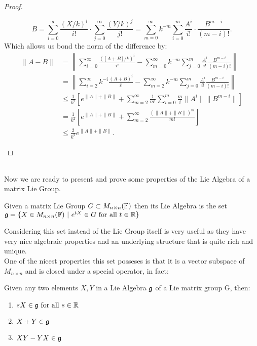 \begin{proof}
\begin{enumerate}[label=(\alph*)]
		$$B=\sum_{i=0}^\infty \frac{(X/k)^i}{i!}\cdot  \sum_{j=0}^\infty   \frac{(Y/k)^j}{j!}= \sum_{m=0}^\infty k^{-m} \sum_{i=0}^m \frac{A^i}{i!}\cdot \frac{B^{m-i}}{(m-i)!}.$$
		Which allows us bond the norm of the difference by:
		\begin{align*}
		\|A-B\| &= \left\|\sum_{i=0}^\infty \frac{([A+B]/k)^i}{i!} - \sum_{m=0}^\infty k^{-m} \sum_{j=0}^m \frac{A^i}{i!}\frac{B^{m-i}}{(m-i)!}\right\|\\
		&=\left\|\sum_{i=2}^\infty k^{-i}\frac{(A+B)^i}{i!} - \sum_{m=2}^\infty k^{-m}\sum_{j=0}^m \frac{A^i}{i!}\frac{B^{m-i}}{(m-i)!}\right\|\\
		&\le \frac{1}{k^2}\left[e^{\|A\|+\|B\|}+\sum_{m=2}^\infty \frac{1}{m!}\sum_{i=0}^m \frac{m}{i}\|A^i\| \|B^{m-i}\|\right]\\
		&= \frac{1}{k^2}\left[e^{\|A\|+\|B\|} + \sum_{m=2}^\infty \frac{(\|A\|+\|B\|)^m}{m!}\right]\\
		&\le \frac{2}{k^2}e^{\|A\|+\|B\|}.
		\end{align*}
	\end{enumerate}
\end{proof}\\
Now we are ready to present and prove some properties of the Lie Algebra of a matrix Lie Group.
\begin{defi}
	Given a matrix Lie Group $G\subset M_{n\times n}(\mathbb{F})$ then its Lie Algebra is the set $\mathfrak{g} = \{X \in M_{n\times n}(\mathbb{F})\ |\ e^{tX} \in G \text{ for all } t\in\mathbb{R}\}$
	\label{LIEALGEBRAFROMMLG}
\end{defi}
Considering this set instead of the Lie Group itself is very useful as they have very nice algebraic properties and an underlying structure that is quite rich and unique.\\
One of the nicest properties this set posseses is that it is a vector subspace of $M_{n\times n}$ and is closed under a special operator, in fact:
\begin{prop}
Given any two elements $X,Y$ in a Lie Algebra $\mathfrak{g}$ of a Lie matrix group G, then:
\begin{enumerate}[label=(\alph*)]
	\item $sX \in \mathfrak{g} \text{ for all } s \in \mathbb{R}$
	\item $X+Y \in \mathfrak{g}$
	\item $XY-YX \in \mathfrak{g}$
\end{enumerate}
\end{prop}
\label{11LieAlgebraAxiomaticDeduction} 
